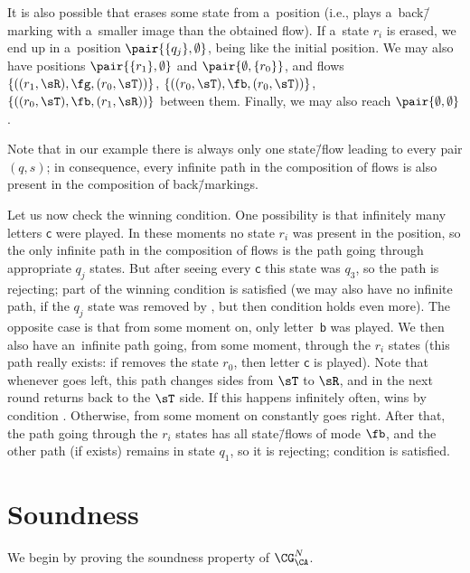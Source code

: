 \begin{exa}
	It is also possible that \adam erases some state from a~position (i.e., plays a~back\=/marking with a~smaller image than the obtained flow).
	If a~state $r_i$ is erased, we end up in a~position $\pair{\{q_j\},\emptyset}$, being like the initial position.
	We may also have positions $\pair{\{r_1\},\emptyset}$ and $\pair{\emptyset,\{r_0\}}$,
	and flows $\{((r_1,\sR),\fg,(r_0,\sT))\}$, $\{((r_0,\sT),\fb,(r_0,\sT))\}$, $\{((r_0,\sT),\fb,(r_1,\sR))\}$ between them.
	Finally, we may also reach $\pair{\emptyset,\emptyset}$.
	
	Note that in our example there is always only one state\=/flow leading to every pair $(q,s)$;
	in consequence, every infinite path in the composition of flows is also present in the composition of back\=/markings.
	
	Let us now check the winning condition.
	One possibility is that infinitely many letters $\mathsf{c}$ were played.
	In these moments no state $r_i$ was present in the position, so the only infinite path in the composition of flows is the path going through appropriate $q_j$ states.
	But after seeing every $\mathsf{c}$ this state was $q_3$, so the path is rejecting; part  of the winning condition is satisfied
	(we may also have no infinite path, if the $q_j$ state was removed by \adam, but then condition  holds even more).
	The opposite case is that from some moment on, only letter~$\mathsf{b}$ was played.
	We then also have an~infinite path going, from some moment, through the $r_i$ states (this path really exists: if \adam removes the state $r_0$, then letter $\mathsf{c}$ is played).
	Note that whenever \adam goes left, this path changes sides from $\sT$ to $\sR$, and in the next round returns back to the $\sT$ side.
	If this happens infinitely often, \eve wins by condition .
	Otherwise, from some moment on \adam constantly goes right.
	After that, the path going through the $r_i$ states has all state\=/flows of mode $\fb$,
	and the other path (if exists) remains in state $q_1$, so it is rejecting;
	condition  is satisfied.
\end{exa}



\section{Soundness}
\label{sec:soundness}

We begin by proving the soundness property of $\CG^N_\CA$.

